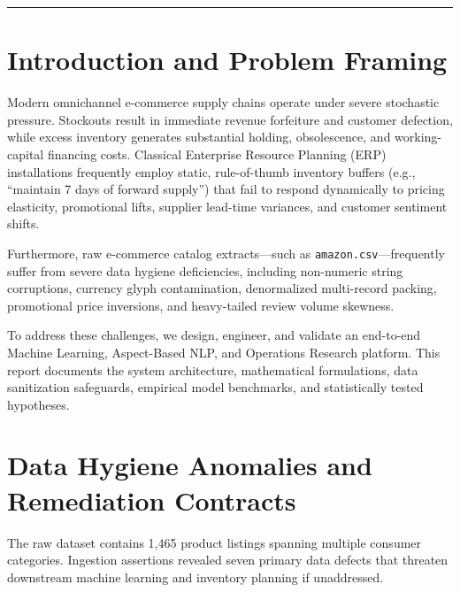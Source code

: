 \documentclass[11pt,a4paper]{article}
\begin{document}
\vspace{1.0em}
\hrule
\vspace{1.5em}

\section{Introduction and Problem Framing}
Modern omnichannel e-commerce supply chains operate under severe stochastic pressure. Stockouts result in immediate revenue forfeiture and customer defection, while excess inventory generates substantial holding, obsolescence, and working-capital financing costs. Classical Enterprise Resource Planning (ERP) installations frequently employ static, rule-of-thumb inventory buffers (e.g., ``maintain 7 days of forward supply'') that fail to respond dynamically to pricing elasticity, promotional lifts, supplier lead-time variances, and customer sentiment shifts.

Furthermore, raw e-commerce catalog extracts—such as \texttt{amazon.csv}—frequently suffer from severe data hygiene deficiencies, including non-numeric string corruptions, currency glyph contamination, denormalized multi-record packing, promotional price inversions, and heavy-tailed review volume skewness.

To address these challenges, we design, engineer, and validate an end-to-end Machine Learning, Aspect-Based NLP, and Operations Research platform. This report documents the system architecture, mathematical formulations, data sanitization safeguards, empirical model benchmarks, and statistically tested hypotheses.

\section{Data Hygiene Anomalies and Remediation Contracts}
The raw dataset contains 1,465 product listings spanning multiple consumer categories. Ingestion assertions revealed seven primary data defects that threaten downstream machine learning and inventory planning if unaddressed.
\end{document}
